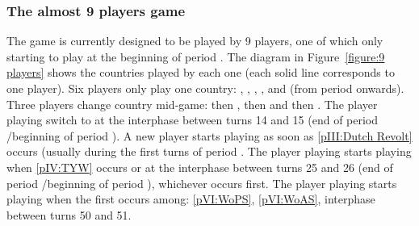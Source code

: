 \subsubsection{The almost 9 players game}
\aparag The game is currently designed to be played by 9 players, one of which
only starting to play at the beginning of period .
\bparag The diagram in Figure~\ref{figure:9 players} shows the countries
played by each one (each solid line corresponds to one player).
\bparag Six players only play one country: \ANG, \FRA, \HIS, \TUR, \RUS and
\HOL (from period  onwards).
\bparag Three players change country mid-game: \POR then \SUE, \VEN then \AUS
and \POL then \PRU.
\bparag The player playing \POR switch to \SUE at the interphase between turns
14 and 15 (end of period /beginning of period ).
\bparag A new player starts playing \HOL as soon as \ref{pIII:Dutch Revolt}
occurs (usually during the first turns of period .
\bparag The player playing \VEN starts playing \AUS when \ref{pIV:TYW} occurs
or at the interphase between turns 25 and 26 (end of period
/beginning of period ), whichever occurs first.
\bparag The player playing \POL starts playing \PRU when the first occurs
among: \ref{pVI:WoPS}, \ref{pVI:WoAS}, interphase between turns 50 and 51.
